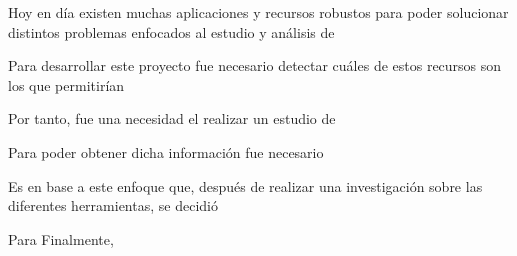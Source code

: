 Hoy en día existen muchas aplicaciones y recursos robustos para poder solucionar
distintos problemas enfocados al estudio y análisis de 

Para desarrollar este proyecto fue necesario detectar cuáles de estos recursos
son los que permitirían

Por tanto, fue una necesidad el realizar un estudio de 

Para poder obtener dicha información fue necesario 

Es en base a este enfoque que, después de realizar una investigación sobre las diferentes herramientas,
se decidió

Para 
Finalmente,

